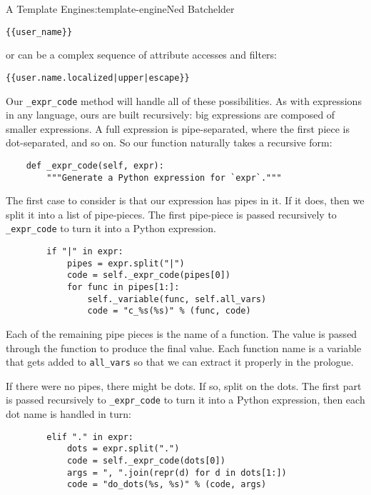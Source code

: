 \begin{aosachapter}{A Template Engine}{s:template-engine}{Ned Batchelder}
\begin{verbatim}
{{user_name}}
\end{verbatim}

or can be a complex sequence of attribute accesses and filters:

\begin{verbatim}
{{user.name.localized|upper|escape}}
\end{verbatim}

Our \texttt{\_expr\_code} method will handle all of these possibilities.
As with expressions in any language, ours are built recursively: big
expressions are composed of smaller expressions. A full expression is
pipe-separated, where the first piece is dot-separated, and so on. So
our function naturally takes a recursive form:

\begin{verbatim}
    def _expr_code(self, expr):
        """Generate a Python expression for `expr`."""
\end{verbatim}

The first case to consider is that our expression has pipes in it. If it
does, then we split it into a list of pipe-pieces. The first pipe-piece
is passed recursively to \texttt{\_expr\_code} to turn it into a Python
expression.

\begin{verbatim}
        if "|" in expr:
            pipes = expr.split("|")
            code = self._expr_code(pipes[0])
            for func in pipes[1:]:
                self._variable(func, self.all_vars)
                code = "c_%s(%s)" % (func, code)
\end{verbatim}

Each of the remaining pipe pieces is the name of a function. The value
is passed through the function to produce the final value. Each function
name is a variable that gets added to \texttt{all\_vars} so that we can
extract it properly in the prologue.

If there were no pipes, there might be dots. If so, split on the dots.
The first part is passed recursively to \texttt{\_expr\_code} to turn it
into a Python expression, then each dot name is handled in turn:

\begin{verbatim}
        elif "." in expr:
            dots = expr.split(".")
            code = self._expr_code(dots[0])
            args = ", ".join(repr(d) for d in dots[1:])
            code = "do_dots(%s, %s)" % (code, args)
\end{verbatim}


\end{aosachapter}
